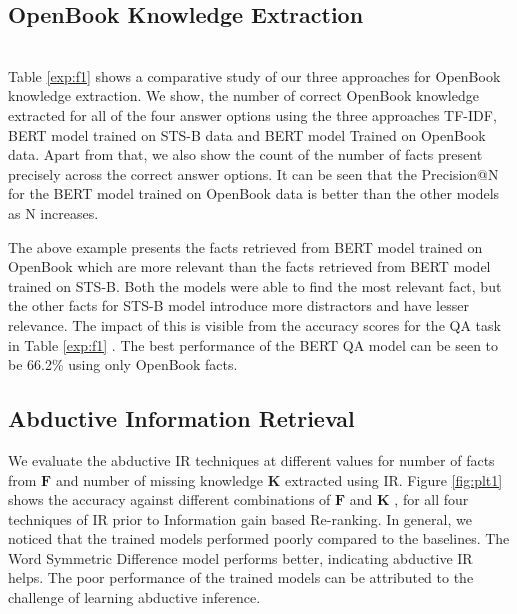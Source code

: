 \documentclass[11pt,a4paper]{article}
\begin{document}
\subsection{OpenBook Knowledge Extraction}
\noindent
{}\\

Table \ref{exp:f1} shows a comparative study of our three approaches for OpenBook knowledge extraction. We show, the number of correct OpenBook knowledge extracted for all of the four answer options  using the three approaches TF-IDF, BERT model trained on STS-B data and BERT model Trained on OpenBook data. Apart from that, we also show the count of the number of facts present precisely across the correct answer options. It can be seen that the Precision@N for the BERT model trained on OpenBook data is better than the other models as N increases. 

The above example presents the facts retrieved from BERT model trained on OpenBook which  are more relevant than the facts retrieved from BERT model trained on STS-B.  Both the models were able to find the most relevant fact, but the other facts for STS-B model introduce more distractors and have lesser relevance. The impact of this is visible  from the accuracy scores for the QA task in Table \ref{exp:f1} . The best performance of the BERT QA model can be seen to be 66.2\% using only OpenBook facts.


\subsection{Abductive Information Retrieval}
We evaluate the abductive IR techniques at different values for number of facts from $\mathbf{F}$ and number of missing knowledge $\mathbf{K}$ extracted using IR. Figure \ref{fig:plt1} shows the accuracy against different combinations of $\mathbf{F}$ and $\mathbf{K}$ , for all four techniques of IR prior to Information gain based Re-ranking. In general, we noticed that the trained models performed poorly compared to the baselines. The Word Symmetric Difference  model performs better, indicating abductive IR helps. The poor performance of the trained models can be attributed to the challenge of learning abductive inference. 
\end{document}
